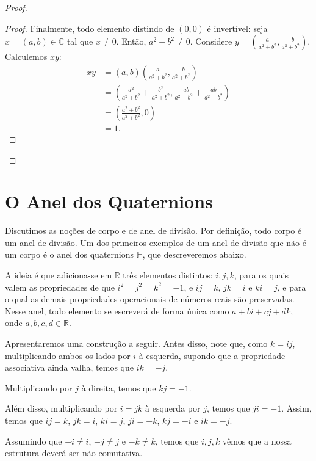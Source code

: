\begin{proof}
\begin{proof}
        Finalmente, todo elemento distindo de $(0, 0)$ é invertível: seja $x=(a, b)\in \mathbb C$ tal que $x\neq 0$.
        Então, $a^2+b^2\neq 0$.
        Considere $y=(\frac{a}{a^2+b^2}, \frac{-b}{a^2+b^2})$.
        Calculemos $xy$:
        \begin{align*}
            xy &=(a, b)(\frac{a}{a^2+b^2}, \frac{-b}{a^2+b^2})\\
            &=(\frac{a^2}{a^2+b^2}+\frac{b^2}{a^2+b^2}, \frac{-ab}{a^2+b^2}+\frac{ab}{a^2+b^2})\\
            &=\left(\frac{a^2+b^2}{a^2+b^2}, 0\right)\\
            &=1.
        \end{align*}
    \end{proof}
\end{proof}
\section{O Anel dos Quaternions}
Discutimos as noções de corpo e de anel de divisão.
Por definição, todo corpo é um anel de divisão.
Um dos primeiros exemplos de um anel de divisão que não é um corpo é o anel dos quaternions $\mathbb H$, que descreveremos abaixo.

A ideia é que adiciona-se em $\mathbb R$ três elementos distintos: $i, j, k$, para os quais valem as propriedades de que $i^2=j^2=k^2=-1$, e $ij=k$, $jk=i$ e $ki=j$, e para o qual as demais propriedades operacionais de números reais são preservadas. Nesse anel, todo elemento se escreverá de forma única como $a+bi+cj+dk$, onde $a,b,c,d\in \mathbb R$.

Apresentaremos uma construção a seguir. Antes disso, note que, como $k=ij$, multiplicando ambos os lados por $i$ à esquerda, supondo que a propriedade associativa ainda valha, temos que $ik=-j$.

Multiplicando por $j$ à direita, temos que $kj=-1$.

Além disso, multiplicando por $i=jk$ à esquerda por $j$, temos que $ji=-1$. Assim, temos que $ij=k$, $jk=i$, $ki=j$, $ji=-k$, $kj=-i$ e $ik=-j$.

Assumindo que $-i\neq i$, $-j\neq j$ e $-k\neq k$, temos que $i,j,k$ vêmos que a nossa estrutura deverá ser não comutativa.

